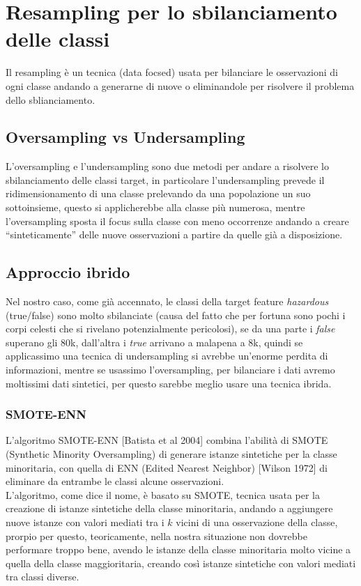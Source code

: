\documentclass[italian,12pt,a4paper]{article}
\begin{document}
	\section{Resampling per lo sbilanciamento delle classi}
	Il resampling è un tecnica (data focsed) usata per bilanciare le osservazioni di ogni classe andando a generarne di nuove o eliminandole per risolvere il problema dello sblianciamento.
	
	\subsection{Oversampling vs Undersampling}

	L’oversampling e l’undersampling sono due metodi per andare a risolvere lo sbilanciamento delle classi target, in particolare l’undersampling prevede il ridimensionamento di una classe prelevando da una popolazione un suo sottoinsieme, questo si applicherebbe alla classe più numerosa, mentre l’oversampling sposta il focus sulla classe con meno occorrenze andando a creare “sinteticamente” delle nuove osservazioni a partire da quelle già a disposizione.
	
	\subsection{Approccio ibrido}
	Nel nostro caso, come già accennato, le classi della target feature \textit{hazardous} (true/false) sono molto sbilanciate (causa del fatto che per fortuna sono pochi i corpi celesti che si rivelano potenzialmente pericolosi), se da una parte i \textit{false} superano gli 80k, dall'altra i \textit{true} arrivano a malapena a 8k, quindi se applicassimo una tecnica di undersampling si avrebbe un’enorme perdita di informazioni, mentre se usassimo l’oversampling, per bilanciare i dati avremo moltissimi dati sintetici, per questo sarebbe meglio usare una tecnica ibrida.
	\linebreak
	\subsubsection{SMOTE-ENN}
	L’algoritmo SMOTE-ENN [Batista et al 2004] combina l’abilità di SMOTE (Synthetic Minority Oversampling)  di generare istanze sintetiche per la classe minoritaria, con quella di ENN (Edited Nearest Neighbor) [Wilson 1972] di eliminare da entrambe le classi alcune osservazioni. \\
	\linebreak
	L'algoritmo, come dice il nome, è basato su SMOTE, tecnica usata per la creazione di istanze sintetiche della classe minoritaria, andando a aggiungere nuove istanze con valori mediati tra i $k$ vicini di una osservazione della classe, prorpio per questo, teoricamente, nella nostra situazione non dovrebbe performare troppo bene, avendo le istanze della classe minoritaria molto vicine a quella della classe maggioritaria, creando così istanze sintetiche con valori mediati tra classi diverse.
	
\end{document}

